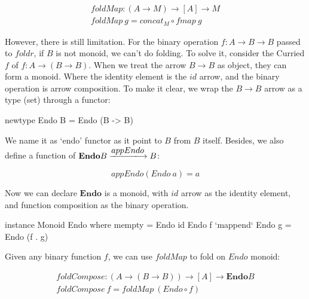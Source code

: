 \documentclass[b5paper]{article}
\begin{document}
\begin{center}
\end{center}

\[
\begin{array}{l}
foldMap : (A \to M) \to [A] \to M \\
foldMap\ g = concat_M \circ fmap\ g
\end{array}
\]

However, there is still limitation. For the binary operation $f : A \to B \to B$ passed to $foldr$, if $B$ is not monoid, we can't do folding. To solve it, consider the Curried $f$ of $f : A \to (B \to B)$. When we treat the arrow $B \to B$ as object, they can form a monoid. Where the identity element is the $id$ arrow, and the binary operation is arrow composition. To make it clear, we wrap the $B \to B$ arrow as a type (set) through a functor:

\begin{Haskell}[frame=none]
newtype Endo B = Endo (B -> B)
\end{Haskell}

We name it as `endo' functor as it point to $B$ from $B$ itself. Besides, we also define a function of $\mathbf{Endo}B \arrowto{appEndo} B$:

\[
appEndo(Endo\ a) = a
\]

Now we can declare $\mathbf{Endo}$ is a monoid, with $id$ arrow as the identity element, and function composition as the binary operation.

\begin{Haskell}
instance Monoid Endo where
    mempty = Endo id
    Endo f `mappend` Endo g = Endo (f . g)
\end{Haskell}

Given any binary function $f$, we can use $foldMap$ to fold on $Endo$ monoid:

\[
\begin{array}{l}
foldCompose : (A \to (B \to B)) \to [A] \to \mathbf{Endo}B \\
foldCompose\ f = foldMap\ (Endo \circ f)
\end{array}
\]
\end{document}
